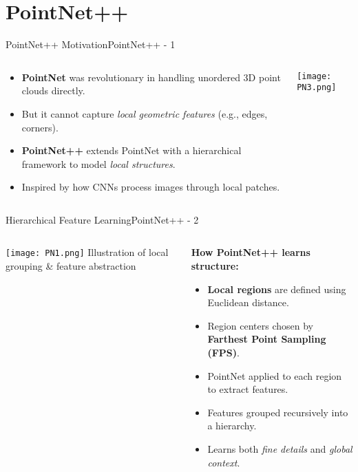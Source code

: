 \documentclass{beamer}
\begin{document}
        
	\section{PointNet++}
	
\begin{frame}{PointNet++ Motivation}{PointNet++ - 1}
\begin{columns}[T]
  \begin{column}{0.55\textwidth}
    \begin{itemize}
      \item \textbf{PointNet} was revolutionary in handling unordered 3D point clouds directly.
      \item But it cannot capture \textit{local geometric features} (e.g., edges, corners).
      \item \textbf{PointNet++} extends PointNet with a hierarchical framework to model \textit{local structures}.
      \item Inspired by how CNNs process images through local patches.
    \end{itemize}
  \end{column}
  
  \begin{column}{0.45\textwidth}
    \texttt{[image: PN3.png]}
  \end{column}
\end{columns}
\end{frame}


\begin{frame}{Hierarchical Feature Learning}{PointNet++ - 2}
\begin{columns}[T]

\begin{column}{0.5\textwidth}
    \centering
    \texttt{[image: PN1.png]}
    \vspace{0.5em}
    \scriptsize Illustration of local grouping \& feature abstraction
\end{column}

\begin{column}{0.5\textwidth}
    \small
    \textbf{How PointNet++ learns structure:}
    \begin{itemize}
        \item \textbf{Local regions} are defined using Euclidean distance.
        \item Region centers chosen by \textbf{Farthest Point Sampling (FPS)}.
        \item PointNet applied to each region to extract features.
        \item Features grouped recursively into a hierarchy.
        \item Learns both \textit{fine details} and \textit{global context}.
    \end{itemize}
\end{column}

\end{columns}
\end{frame}
\end{document}

